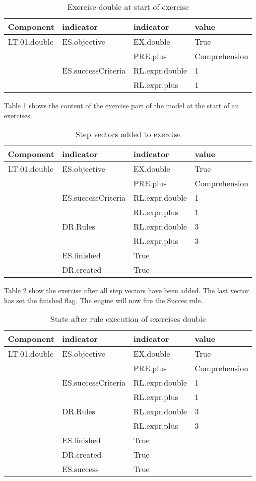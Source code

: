 \begin{table}[H]
\begin{tabular}{| l | l | l | l |}
\hline
Component & indicator & indicator & value\\
\hline
LT.01.double & ES.objective &EX.double & True\\
 & & PRE.plus &Comprehension\\
 & ES.successCriteria &RL.expr.double & 1\\
 & & RL.expr.plus &1\\
\hline
\end{tabular}
\caption{Exercise double at start of exercise}
\label{double.before}
\end{table}

Table \ref{double.before} shows the content of the exercise part of the model at the start of an exercises.







\begin{table}[H]
\begin{tabular}{| l | l | l | l |}
\hline
Component & indicator & indicator & value\\
\hline
LT.01.double & ES.objective &EX.double & True\\
 & & PRE.plus &Comprehension\\
 & ES.successCriteria &RL.expr.double & 1\\
 & & RL.expr.plus &1\\
& DR.Rules & RL.expr.double & 3 \\
& & RL.expr.plus & 3\\
& ES.finished & True & \\
& DR.created & True & \\
\hline
\end{tabular}
\caption{Step vectors added to exercise}
\label{double.stepsadded}
\end{table}

Table \ref{double.stepsadded} show the exercise after all step vectors have been added.
The last vector has set the finished flag. 
The engine will now fire the Succes rule.

\begin{table}[H]
\begin{tabular}{| l | l | l | l |}
\hline
Component & indicator & indicator & value\\
\hline
LT.01.double & ES.objective &EX.double & True\\
 & & PRE.plus &Comprehension\\
 & ES.successCriteria &RL.expr.double & 1\\
 & & RL.expr.plus &1\\
& DR.Rules & RL.expr.double & 3 \\
& & RL.expr.plus & 3\\
& ES.finished & True & \\
& DR.created & True & \\
& ES.success & True &\\
\hline
\end{tabular}
\caption{State after rule execution of exercises double}
\label{double.final}
\end{table}

